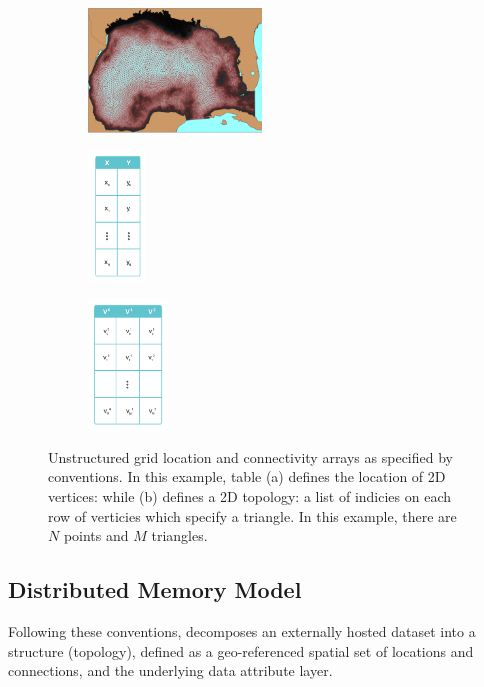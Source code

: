 \begin{figure}
  \centering
  \begin{subfigure}[t]{0.33\textwidth}
    \centering
    \includegraphics[height=1.3in]{../figs/USF_FVCOM_Hurricane_Ike_2D_final_run_with_waves_topology.png}
    \caption{}
    \label{fig:usf_fvcom_ugrid}
  \end{subfigure}
  \begin{subfigure}[t]{0.32\textwidth}
    \centering
    \includegraphics[height=1.35in]{../figs/xy_table}
    \caption{}
    \label{fig:xytable}
  \end{subfigure}
  \begin{subfigure}[t]{0.32\textwidth}
    \centering
    \includegraphics[height=1.35in]{../figs/v_table}
    \caption{}
    \label{fig:vtable}
  \end{subfigure}
  \caption{Unstructured grid location and connectivity arrays as
    specified by \cfugrid{} conventions. In this example, table (a)
    defines the location of 2D vertices: while (b) defines a 2D
    topology: a list of indicies on each row of verticies which
    specify a triangle. In this example, there are $N$ points and $M$
    triangles.}
\end{figure}

\subsection{Distributed Memory Model}
Following these conventions, \sciwms{} decomposes an externally hosted
dataset into a structure (topology), defined as a geo-referenced
spatial set of locations and connections, and the underlying data
attribute layer.

